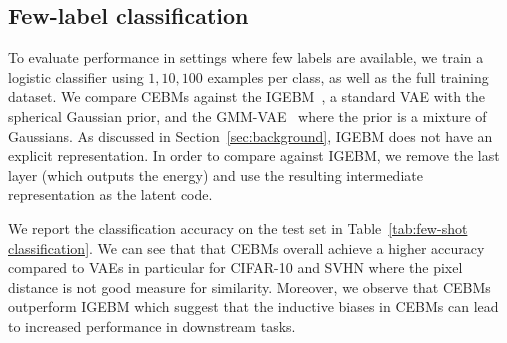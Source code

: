 \documentclass{article}
\begin{document}
\vspace*{-1.0ex}
\subsection{Few-label classification}\label{sec:exp:fewshots}
\vspace*{-1.0ex}


To evaluate performance in settings where few labels are available, we train a logistic classifier using $1, 10, 100$ examples per class, as well as the full training dataset. We compare CEBMs against the  IGEBM~\cite{du2019implicit}, a standard VAE  with the spherical Gaussian prior, and the GMM-VAE~\cite{tomczak2018vae} where the prior is a mixture of Gaussians. As discussed in Section~\ref{sec:background}, IGEBM does not have an explicit representation. In order to compare against IGEBM, we remove the last layer (which outputs the energy) and use the resulting intermediate representation as the latent code. 

We report the classification accuracy on the test set in Table~\ref{tab:few-shot classification}. We can see that that CEBMs overall achieve a higher accuracy compared to VAEs in particular for CIFAR-10 and SVHN where the pixel distance is not good measure for similarity. Moreover, we observe that CEBMs outperform IGEBM which suggest that the inductive biases in CEBMs can lead to increased performance in downstream tasks. 
\end{document}
